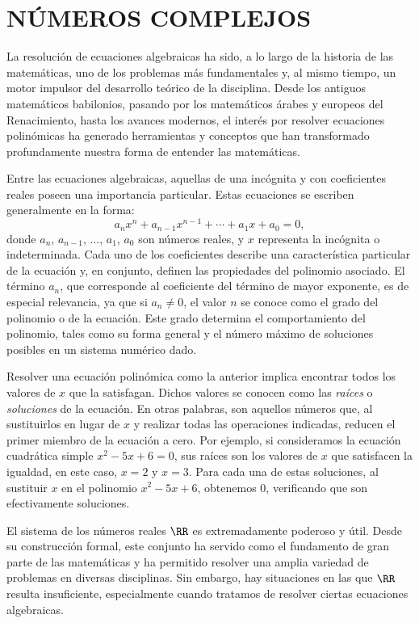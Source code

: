 \chapter{NÚMEROS COMPLEJOS}\label{chap:numeros-complejos}

La resolución de ecuaciones algebraicas ha sido, a lo largo de la historia de las matemáticas, uno de los problemas más fundamentales y, al mismo tiempo, un motor impulsor del desarrollo teórico de la disciplina. Desde los antiguos matemáticos babilonios, pasando por los matemáticos árabes y europeos del Renacimiento, hasta los avances modernos, el interés por resolver ecuaciones polinómicas ha generado herramientas y conceptos que han transformado profundamente nuestra forma de entender las matemáticas.

Entre las ecuaciones algebraicas, aquellas de una incógnita y con coeficientes reales poseen una importancia particular. Estas ecuaciones se escriben generalmente en la forma:
$$a_n x^n + a_{n-1}x^{n-1} + \cdots + a_1x + a_0 = 0,$$
donde $a_n$, $a_{n-1}$, $\dots$, $a_1$, $a_0$ son números reales, y $x$ representa la incógnita o indeterminada. Cada uno de los coeficientes describe una característica particular de la ecuación y, en conjunto, definen las propiedades del polinomio asociado. El término $a_n$, que corresponde al coeficiente del término de mayor exponente, es de especial relevancia, ya que si $a_n \neq 0$, el valor $n$ se conoce como el grado del polinomio o de la ecuación. Este grado determina el comportamiento del polinomio, tales como su forma general y el número máximo de soluciones posibles en un sistema numérico dado.

Resolver una ecuación polinómica como la anterior implica encontrar todos los valores de $x$ que la satisfagan. Dichos valores se conocen como las \emph{raíces} o \emph{soluciones} de la ecuación. En otras palabras, son aquellos números que, al sustituirlos en lugar de $x$ y realizar todas las operaciones indicadas, reducen el primer miembro de la ecuación a cero. Por ejemplo, si consideramos la ecuación cuadrática simple $x^2 - 5x + 6 = 0$, sus raíces son los valores de $x$ que satisfacen la igualdad, en este caso, $x = 2$ y $x = 3$. Para cada una de estas soluciones, al sustituir $x$ en el polinomio $x^2 - 5x + 6$, obtenemos $0$, verificando que son efectivamente soluciones.

\newpage

El sistema de los números reales $\RR$ es extremadamente poderoso y útil. Desde su construcción formal, este conjunto ha servido como el fundamento de gran parte de las matemáticas y ha permitido resolver una amplia variedad de problemas en diversas disciplinas. Sin embargo, hay situaciones en las que $\RR$ resulta insuficiente, especialmente cuando tratamos de resolver ciertas ecuaciones algebraicas.


